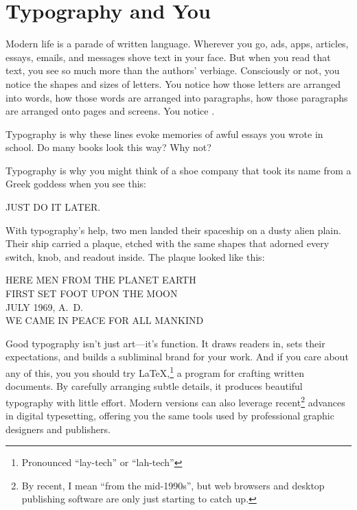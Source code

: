 \chapter{Typography and You}
\label{typography}

Modern life is a parade of written language.
Wherever you go,
ads, apps, articles, essays, emails, and messages
shove text in your face.
But when you read that text, you see so much more than the authors'
verbiage.
Consciously or not, you notice the shapes and sizes of letters.
You notice how those letters are arranged into words,
how those words are arranged into paragraphs,
how those paragraphs are arranged onto pages and screens.
You notice .
\begin{leftfigure}
\fontsize{12bp}{24bp}\selectfont\raggedright
Typography is why these lines evoke memories of awful essays
you wrote in school.
Do many books look this way? Why not?
\end{leftfigure}
\medskip

\noindent Typography is why you might think of a shoe company that took
its name from a Greek goddess when you see this:
\begin{leftfigure}
\Large JUST DO IT LATER.
\end{leftfigure}
With typography's help, two men landed their spaceship on a dusty alien plain.
Their ship carried a plaque, etched with the same shapes that adorned every
switch, knob, and readout inside. The plaque looked like this:
\begin{center}
HERE MEN FROM THE PLANET EARTH \\
FIRST SET FOOT UPON THE MOON \\
JULY 1969, A.~D. \\
WE CAME IN PEACE FOR ALL MANKIND
\end{center}

Good typography isn't just art---it's function.
It draws readers in,
sets their expectations, and builds a subliminal brand for your
work.\punckern{}
And if you care about any of this,
you you should try \LaTeX,\punckern\footnote{Pronounced ``lay-tech''
or ``lah-tech''}
a program for crafting written documents.
By carefully arranging subtle details,
it produces beautiful typography with little effort.
Modern versions can also leverage recent\footnote{By recent,
I mean ``from the mid-1990s''\quotekern, but web browsers and desktop publishing
software are only just starting to catch up.} advances in digital typesetting,
offering you the same tools used by professional graphic designers and
publishers.

